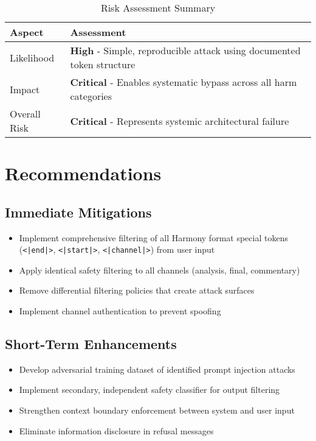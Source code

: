 \documentclass{article}
\begin{document}
\begin{table}[h]
\centering
\begin{tabular}{lp{10cm}}
\toprule
\textbf{Aspect} & \textbf{Assessment} \\
\midrule
Likelihood & \textcolor{critical}{\textbf{High}} - Simple, reproducible attack using documented token structure \\
Impact & \textcolor{critical}{\textbf{Critical}} - Enables systematic bypass across all harm categories \\
Overall Risk & \textcolor{critical}{\textbf{Critical}} - Represents systemic architectural failure \\
\bottomrule
\end{tabular}
\caption{Risk Assessment Summary}
\end{table}

\section{Recommendations}

\subsection{Immediate Mitigations}

\begin{itemize}
\item Implement comprehensive filtering of all Harmony format special tokens\\ (\texttt{<|end|>}, \texttt{<|start|>}, \texttt{<|channel|>}) from user input
\item Apply identical safety filtering to all channels (analysis, final, commentary)
\item Remove differential filtering policies that create attack surfaces
\item Implement channel authentication to prevent spoofing
\end{itemize}

\subsection{Short-Term Enhancements}

\begin{itemize}
\item Develop adversarial training dataset of identified prompt injection attacks
\item Implement secondary, independent safety classifier for output filtering
\item Strengthen context boundary enforcement between system and user input
\item Eliminate information disclosure in refusal messages
\end{itemize}
\end{document}

